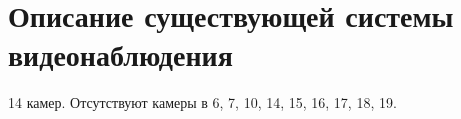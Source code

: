 \section{Описание существующей системы видеонаблюдения}

14 камер.
Отсутствуют камеры в 6, 7, 10, 14, 15, 16, 17, 18, 19.